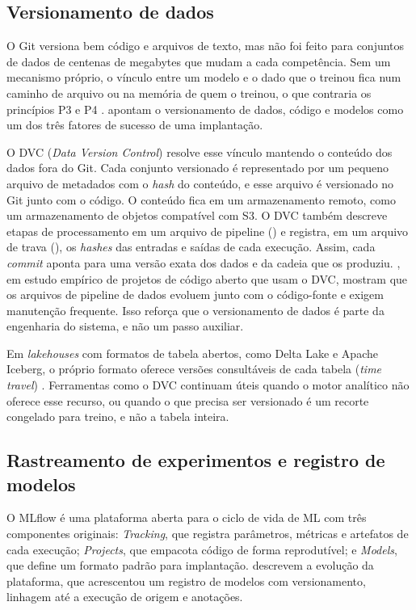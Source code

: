 \subsection{Versionamento de dados}

O Git versiona bem código e arquivos de texto, mas não foi feito para conjuntos de dados de centenas de megabytes que mudam a cada competência. Sem um mecanismo próprio, o vínculo entre um modelo e o dado que o treinou fica num caminho de arquivo ou na memória de quem o treinou, o que contraria os princípios P3 e P4 \cite{kreuzberger2023}.  apontam o versionamento de dados, código e modelos como um dos três fatores de sucesso de uma implantação.

O DVC (\textit{Data Version Control}) \cite{dvc} resolve esse vínculo mantendo o conteúdo dos dados fora do Git. Cada conjunto versionado é representado por um pequeno arquivo de metadados com o \textit{hash} do conteúdo, e esse arquivo é versionado no Git junto com o código. O conteúdo fica em um armazenamento remoto, como um armazenamento de objetos compatível com S3. O DVC também descreve etapas de processamento em um arquivo de pipeline () e registra, em um arquivo de trava (), os \textit{hashes} das entradas e saídas de cada execução. Assim, cada \textit{commit} aponta para uma versão exata dos dados e da cadeia que os produziu. , em estudo empírico de projetos de código aberto que usam o DVC, mostram que os arquivos de pipeline de dados evoluem junto com o código-fonte e exigem manutenção frequente. Isso reforça que o versionamento de dados é parte da engenharia do sistema, e não um passo auxiliar.

Em \textit{lakehouses} com formatos de tabela abertos, como Delta Lake e Apache Iceberg, o próprio formato oferece versões consultáveis de cada tabela (\textit{time travel}) \cite{armbrust2021}. Ferramentas como o DVC continuam úteis quando o motor analítico não oferece esse recurso, ou quando o que precisa ser versionado é um recorte congelado para treino, e não a tabela inteira.

\subsection{Rastreamento de experimentos e registro de modelos}

O MLflow \cite{zaharia2018} é uma plataforma aberta para o ciclo de vida de ML com três componentes originais: \textit{Tracking}, que registra parâmetros, métricas e artefatos de cada execução; \textit{Projects}, que empacota código de forma reprodutível; e \textit{Models}, que define um formato padrão para implantação.  descrevem a evolução da plataforma, que acrescentou um registro de modelos com versionamento, linhagem até a execução de origem e anotações.

